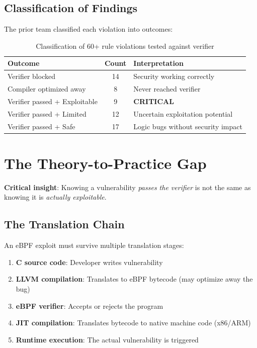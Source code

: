 \subsection{Classification of Findings}

The prior team classified each violation into outcomes:
\begin{table}[h]
\centering
\begin{tabular}{|l|c|l|}
\hline
\textbf{Outcome} & \textbf{Count} & \textbf{Interpretation} \\
\hline
Verifier blocked & 14 & Security working correctly \\
Compiler optimized away & 8 & Never reached verifier \\
Verifier passed + Exploitable & 9 & \textbf{CRITICAL} \\
Verifier passed + Limited & 12 & Uncertain exploitation potential \\
Verifier passed + Safe & 17 & Logic bugs without security impact \\
\hline
\end{tabular}
\caption{Classification of 60+ rule violations tested against verifier}
\end{table}

\section{The Theory-to-Practice Gap}

\textbf{Critical insight}: Knowing a vulnerability \textit{passes the verifier} is not the same as knowing it is \textit{actually exploitable}.

\subsection{The Translation Chain}

An eBPF exploit must survive multiple translation stages:
\begin{enumerate}[label=\arabic*.]
  \item \textbf{C source code}: Developer writes vulnerability
  \item \textbf{LLVM compilation}: Translates to eBPF bytecode (may optimize away the bug)
  \item \textbf{eBPF verifier}: Accepts or rejects the program
  \item \textbf{JIT compilation}: Translates bytecode to native machine code (x86/ARM)
  \item \textbf{Runtime execution}: The actual vulnerability is triggered
\end{enumerate}

